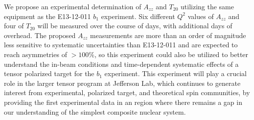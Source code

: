 We propose an experimental determination of $A_{zz}$ and $T_{20}$ utilizing the same equipment as the E13-12-011 $b_1$ experiment.  Six different $Q^2$ values of $A_{zz}$ and four of $T_{20}$ will be measured over the course of \productiondays days, with \overheaddays additional days of overhead. The proposed $A_{zz}$ measurements are more than an order of magnitude less sensitive to systematic uncertainties than E13-12-011 and are expected to reach asymmetries of $>100\%$, so this experiment could also be utilized to better understand the in-beam conditions and time-dependent systematic effects of a tensor polarized target for the $b_1$ experiment. This experiment will play a crucial role in the larger tensor program at Jefferson Lab, which continues to generate interest from experimental, polarized target, and theoretical spin communities, by providing the first experimental data in an region where there remains a gap in our understanding of the simplest composite nuclear system.











